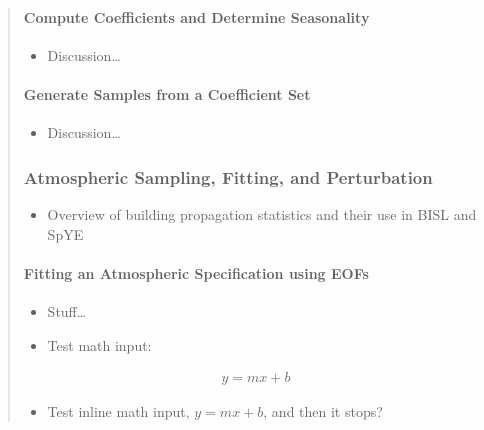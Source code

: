 \documentclass[letterpaper,10pt,english]{sphinxmanual}
\begin{document}
\begin{quote}
\begin{itemize}
\end{itemize}


\paragraph{Compute Coefficients and Determine Seasonality}
\label{\detokenize{eofs:compute-coefficients-and-determine-seasonality}}\begin{itemize}
\item {} 
Discussion…

\end{itemize}


\paragraph{Generate Samples from a Coefficient Set}
\label{\detokenize{eofs:generate-samples-from-a-coefficient-set}}\begin{itemize}
\item {} 
Discussion…

\end{itemize}


\subsubsection{Atmospheric Sampling, Fitting, and Perturbation}
\label{\detokenize{sampling:atmospheric-sampling-fitting-and-perturbation}}\label{\detokenize{sampling:sampling}}\label{\detokenize{sampling::doc}}\begin{itemize}
\item {} 
Overview of building propagation statistics and their use in BISL and SpYE

\end{itemize}


\paragraph{Fitting an Atmospheric Specification using EOFs}
\label{\detokenize{sampling:fitting-an-atmospheric-specification-using-eofs}}\begin{itemize}
\item {} 
Stuff…

\item {} 
Test math input:

\end{itemize}
\begin{equation*}
\begin{split}y = m x + b\end{split}
\end{equation*}\begin{itemize}
\item {} 
Test inline math input, \(y = m x + b\), and then it stops?


\end{itemize}
\end{quote}
\end{document}
